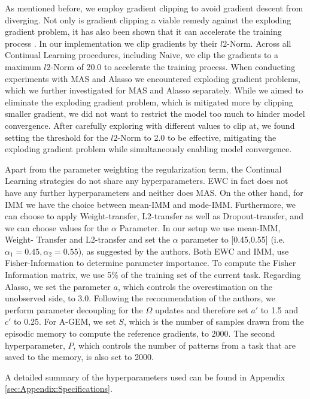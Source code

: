 As mentioned before, we employ gradient clipping to avoid gradient descent from diverging. Not only is gradient clipping a viable remedy against the exploding
gradient problem, it has also been shown that it can accelerate the training process \cite{zhang2019gradient}. In our implementation we clip gradients by their
$l2$-Norm. Across all Continual Learning procedures, including Naive, we clip the gradients to a maximum $l2$-Norm of 20.0 to accelerate the training process.
When conducting experiments with MAS and Alasso we encountered exploding gradient problems, which we further investigated for MAS and Alasso separately. While we
aimed to eliminate the exploding gradient problem, which is mitigated more by clipping smaller gradient, we did not want to restrict the model too much to hinder 
model convergence. After carefully exploring with different values to clip at, we found setting the threshold for the $l2$-Norm to 2.0 to be effective, mitigating
the exploding gradient problem while simultaneously enabling model convergence. \par
Apart from the parameter weighting the regularization term, the Continual Learning strategies do not share any hyperparameters. EWC in fact does not have
any further hyperparameters and neither does MAS. On the other hand, for IMM we have the choice between mean-IMM and mode-IMM. Furthermore, we can choose
to apply Weight-transfer, L2-transfer as well as Dropout-transfer, and we can choose values for the $\alpha$ Parameter. In our setup we use mean-IMM, Weight-
Transfer and L2-transfer and set the $\alpha$ parameter to [0.45,0.55] (i.e. $\alpha_1 = 0.45, \alpha_2 = 0.55$), as suggested by the authors. Both EWC and IMM,
use Fisher-Information to determine parameter importance. To compute the Fisher Information matrix, we use 5\% of the training set of the current task.
Regarding Alasso, we set the parameter $a$, which controls the overestimation on the unobserved side, to 3.0. Following the recommendation of the authors,
we perform parameter decoupling for the $\Omega$ updates and therefore set $a'$ to 1.5 and $c'$ to 0.25. For A-GEM, we set $S$, which is the number of samples
drawn from the episodic memory to compute the reference gradients, to 2000. The second hyperparameter, $P$, which controls the number of patterns from a task that
are saved to the memory, is also set to 2000. \par
A detailed summary of the hyperparameters used can be found in Appendix \ref{sec:Appendix:Specifications}.


